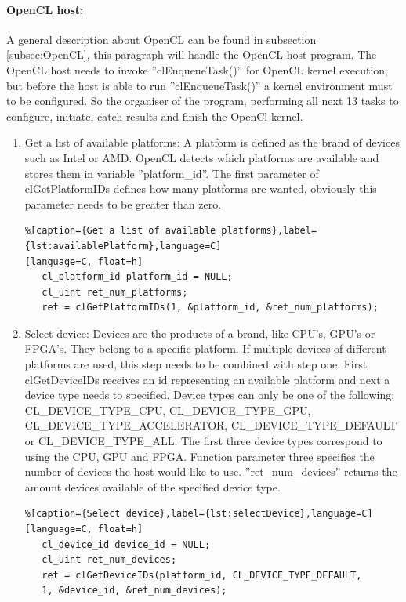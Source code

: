 \documentclass[12pt,a4paper,english,twoside,openright]{tutthesis}
\begin{document}
				\paragraph{OpenCL host:} \label{par:OpenCLHost}
A general description about OpenCL can be found in subsection \ref{subsec:OpenCL}, this paragraph will handle the OpenCL host program. The OpenCL host needs to invoke ''clEnqueueTask()'' for OpenCL kernel execution, but before the host is able to run ''clEnqueueTask()'' a kernel environment must to be configured. So the organiser of the program, performing all next 13 tasks \cite{OpenCLHelloWorld} to configure, initiate, catch results and finish the OpenCl kernel.
\begin{enumerate}
	\item Get a list of available platforms:	A platform is defined as the brand of devices such as Intel or AMD. OpenCL detects which platforms are available and stores them in variable ''platform\_id''. The first parameter of clGetPlatformIDs defines how many platforms are wanted, obviously this parameter needs to be greater than zero.
\begin{lstlisting}%[caption={Get a list of available platforms},label={lst:availablePlatform},language=C]
[language=C, float=h]
   cl_platform_id platform_id = NULL;
   cl_uint ret_num_platforms;
   ret = clGetPlatformIDs(1, &platform_id, &ret_num_platforms);
\end{lstlisting}

	\item Select device:	Devices are the products of a brand, like CPU's, GPU's or FPGA's. They belong to a specific platform. If multiple devices of different platforms are used, this step needs to be combined with step one. First clGetDeviceIDs receives an id representing an available platform and next a device type needs to specified. Device types can only be one of the following: CL\_DEVICE\_TYPE\_CPU, CL\_DEVICE\_TYPE\_GPU, CL\_DEVICE\_TYPE\_ACCELERATOR, CL\_DEVICE\_TYPE\_DEFAULT or CL\_DEVICE\_TYPE\_ALL. The first three device types correspond to using the CPU, GPU and FPGA. Function parameter three specifies the number of devices the host would like to use. ''ret\_num\_devices'' returns the amount devices available of the specified device type.
\begin{lstlisting}%[caption={Select device},label={lst:selectDevice},language=C]
[language=C, float=h]
   cl_device_id device_id = NULL;
   cl_uint ret_num_devices;
   ret = clGetDeviceIDs(platform_id, CL_DEVICE_TYPE_DEFAULT,
   1, &device_id, &ret_num_devices);
\end{lstlisting}


\end{enumerate}
\end{document}

